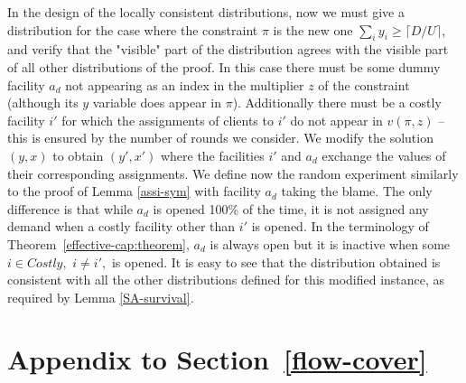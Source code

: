 \documentclass[11pt]{article}
\begin{document}
In the  design of  the locally consistent  distributions, now  we must
give a distribution for the case where the constraint $\pi$ is the new
one $\sum_i y_i \geq \lceil D/U \rceil$, and verify that the "visible"
part of  the distribution  agrees with the  visible part of  all other
distributions of  the proof.   In this case  there must be  some dummy
facility $a_d$ not appearing as an  index in the multiplier $z$ of the
constraint    (although   its    $y$   variable    does    appear   in
$\pi$). Additionally  there must be  a costly facility $i'$  for which
the assignments  of clients to  $i'$ do not  appear in $v(\pi,  z)$ --
this is  ensured by the number  of rounds we consider.   We modify the
solution $(y,x)$  to obtain $(y',  x')$ where the facilities  $i'$ and
$a_d$  exchange the  values  of their  corresponding assignments.   We
define  now the  random experiment  similarly  to the  proof of  Lemma
\ref{assi-sym}  with  facility  $a_d$   taking  the  blame.  The  only
difference is that while $a_d$ is  opened 100\% of the time, it is not
assigned any demand when a  costly facility other than $i'$ is opened.
In  the terminology  of  Theorem~\ref{effective-cap:theorem}, $a_d$  is
always open but  it is inactive when some $i \in  Costly,$ $i \neq i',$
is  opened.  It  is  easy to  see  that the  distribution obtained  is
consistent with all the  other distributions defined for this modified
instance, as required by Lemma \ref{SA-survival}.



\section{Appendix to Section~\ref{flow-cover}}
\end{document}
